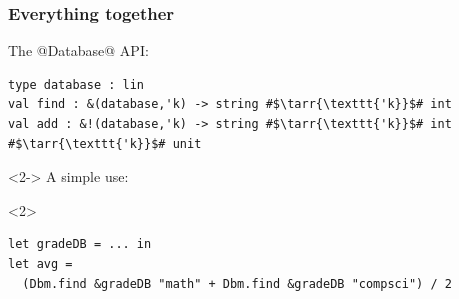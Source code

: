 \documentclass[aspectratio=169,dvipsnames,svgnames,10pt]{beamer}
\begin{document}
\begin{frame}[fragile]
  \frametitle{Everything together}

  The @Database@ API:
\begin{verbatim}
type database : lin
val find : &(database,'k) -> string #$\tarr{\texttt{'k}}$# int
val add : &!(database,'k) -> string #$\tarr{\texttt{'k}}$# int #$\tarr{\texttt{'k}}$# unit
\end{verbatim}
  
  \begin{onlyenv}<2->
    A simple use:
  \end{onlyenv}
  \begin{onlyenv}<2>
\begin{verbatim}
let gradeDB = ... in
let avg =
  (Dbm.find &gradeDB "math" + Dbm.find &gradeDB "compsci") / 2


\end{verbatim}
\end{onlyenv}
\end{frame}
\end{document}
